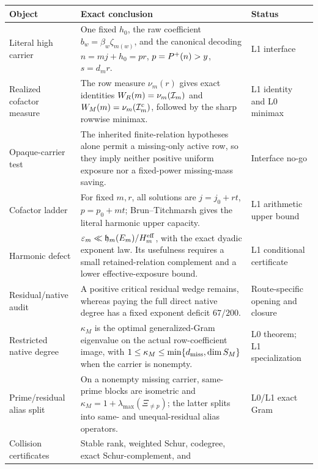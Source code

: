 \begin{center}
\small
\begin{tabular}{>{\raggedright\arraybackslash}p{}
                >{\raggedright\arraybackslash}p{}
                >{\raggedright\arraybackslash}p{}}
\toprule
Object & Exact conclusion & Status\\
\midrule
Literal high carrier
& One fixed \(h_0\), the raw coefficient
  \(b_w=\beta_w\zeta_{m(w)}\), and the canonical decoding
  \(n=mj+h_0=pr\), \(p=P^{+}(n)>y\), \(s=d_mr\).
& L1 interface\\
\addlinespace
Realized cofactor measure
& The row measure \(\nu_m(r)\) gives exact identities
  \(W_R(m)=\nu_m(\mathcal I_m)\) and
  \(W_M(m)=\nu_m(\mathcal I_m^c)\), followed by the sharp rowwise minimax.
& L1 identity and L0 minimax\\
\addlinespace
Opaque-carrier test
& The inherited finite-relation hypotheses alone permit a missing-only
  active row, so they imply neither positive uniform exposure nor a
  fixed-power missing-mass saving.
& Interface no-go\\
\addlinespace
Cofactor ladder
& For fixed \(m,r\), all solutions are
  \(j=j_0+rt\), \(p=p_0+mt\); Brun--Titchmarsh gives the literal
  harmonic upper capacity.
& L1 arithmetic upper bound\\
\addlinespace
Harmonic defect
& \(\varepsilon_m\ll
  \mathfrak h_m(E_m)/H_m^{\rm eff}\), with the exact dyadic exponent
  law.  Its usefulness requires a small retained-relation complement
  and a lower effective-exposure bound.
& L1 conditional certificate\\
\addlinespace
Residual/native audit
& A positive critical residual wedge remains, whereas paying the full
  direct native degree has a fixed exponent deficit \(67/200\).
& Route-specific opening and closure\\
\addlinespace
Restricted native degree
& \(\kappa_M\) is the optimal generalized-Gram eigenvalue on the actual
  row-coefficient image, with
  \(1\le\kappa_M\le\min\{d_{\rm miss},\dim S_M\}\) when the carrier is
  nonempty.
& L0 theorem; L1 specialization\\
\addlinespace
Prime/residual alias split
& On a nonempty missing carrier, same-prime blocks are isometric and
  \(\kappa_M=1+\lambda_{\max}(\Xi_{\ne p})\); the latter splits into
  same- and unequal-residual alias operators.
& L0/L1 exact Gram\\
\addlinespace
Collision certificates
& Stable rank, weighted Schur, codegree, exact Schur-complement, and

\end{tabular}
\end{center}
